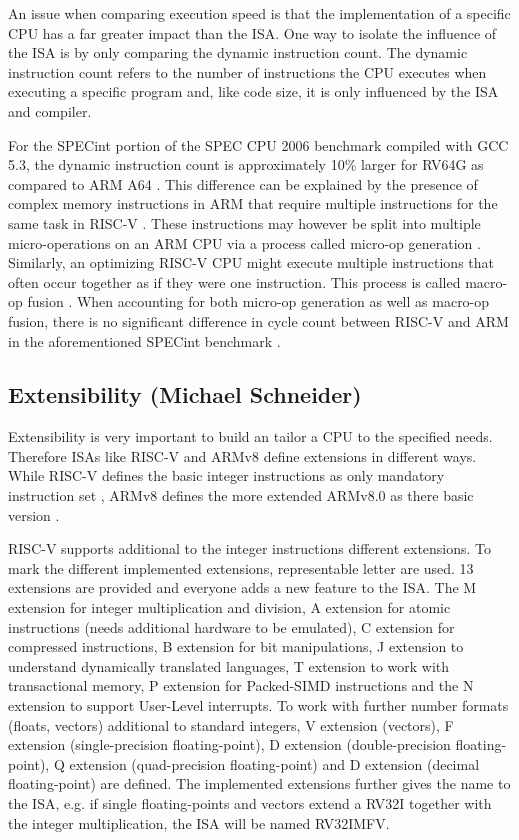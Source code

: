 \documentclass[conference]{IEEEtran}
\begin{document}
	An issue when comparing execution speed is that the implementation of a specific \gls{CPU} has a far greater impact than the \gls{ISA}.
	One way to isolate the influence of the ISA is by only comparing the dynamic instruction count.
	The dynamic instruction count refers to the number of instructions the \gls{CPU} executes when executing a specific program
	and, like code size, it is only influenced by the \gls{ISA} and compiler.

	For the SPECint portion of the SPEC CPU 2006 benchmark compiled with GCC 5.3, the dynamic instruction count is approximately
	10\% larger for RV64G as compared to ARM A64 \cite[slide 38]{Celio2016}.
	This difference can be explained by the presence of complex memory instructions in ARM that require multiple instructions
	for the same task in RISC-V \cite[slide 40]{Celio2016}.
	These instructions may however be split into multiple micro-operations on an ARM \gls{CPU} via a process called micro-op generation \cite[slide 40]{Celio2016}.
	Similarly, an optimizing RISC-V CPU might execute multiple instructions that often occur together as if they were one instruction.
	This process is called macro-op fusion \cite[slide 16]{Celio2016}.
	When accounting for both micro-op generation as well as macro-op fusion, there is no significant difference in cycle count between RISC-V and ARM
	in the aforementioned SPECint benchmark \cite[slide 38]{Celio2016}.


	\subsection{Extensibility (Michael Schneider)}\label{sec:extensibility}
Extensibility is very important to build an tailor a CPU to the specified needs. Therefore \glspl{ISA} like RISC-V and ARMv8 define extensions in different ways. While RISC-V defines the basic integer instructions as only mandatory instruction set \cite{Waterman2017}, ARMv8 defines the more extended ARMv8.0 as there basic version \cite{Arm2020}.

RISC-V supports additional to the integer instructions different extensions. To mark the different implemented extensions, representable letter are used. 13 extensions are provided and everyone adds a new feature to the \gls{ISA}. The M extension for integer multiplication and division, A extension for atomic instructions (needs additional hardware to be emulated), C extension for compressed instructions, B extension for bit manipulations, J extension to understand dynamically translated languages, T extension to work with transactional memory, P extension for Packed-SIMD instructions and the N extension to support User-Level interrupts. To work with further number formats (floats, vectors) additional to standard integers, V extension (vectors), F extension (single-precision floating-point), D extension (double-precision floating-point), Q extension (quad-precision floating-point) and D extension (decimal floating-point) are defined. The implemented extensions further gives the name to the \gls{ISA}, e.g. if single floating-points and vectors extend a RV32I together with the integer multiplication, the \gls{ISA} will be named RV32IMFV. \cite{Waterman2017}
\end{document}
